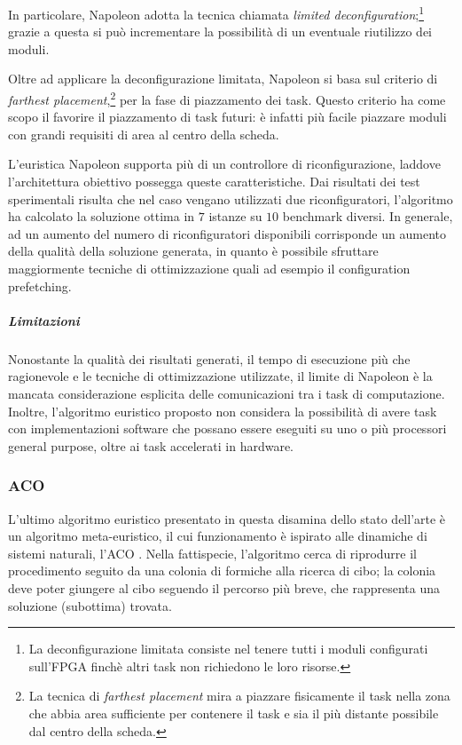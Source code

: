 In particolare, Napoleon adotta la tecnica chiamata \emph{limited 
deconfiguration};\footnote{La deconfigurazione limitata consiste nel tenere 
tutti i moduli configurati sull'\ac{FPGA} finchè altri task non richiedono le 
loro risorse.} grazie a questa si può incrementare la possibilità di 
un eventuale riutilizzo dei moduli.

Oltre ad applicare la deconfigurazione limitata, Napoleon si basa sul criterio 
di \emph{farthest placement},\footnote{La tecnica di \emph{farthest placement} 
mira a piazzare fisicamente il task nella zona che abbia area sufficiente per 
contenere il task e sia il più distante possibile dal centro della scheda.} per 
la fase di piazzamento dei task. Questo criterio ha come scopo il favorire il 
piazzamento di task futuri: è infatti più facile piazzare moduli con grandi 
requisiti di area al centro della scheda.

L'euristica Napoleon supporta più di un controllore di riconfigurazione, 
laddove l'architettura obiettivo possegga queste caratteristiche. Dai risultati 
dei test sperimentali risulta che nel caso vengano utilizzati due 
riconfiguratori, l'algoritmo ha calcolato la soluzione ottima in $7$ istanze su 
$10$ benchmark diversi. In generale, ad un aumento del numero di 
riconfiguratori disponibili corrisponde un aumento della qualità della 
soluzione generata, in quanto è possibile sfruttare maggiormente tecniche di 
ottimizzazione quali ad esempio il configuration prefetching.

\subparagraph{Limitazioni}
Nonostante la qualità dei risultati generati, il tempo di esecuzione più che 
ragionevole e le tecniche di ottimizzazione utilizzate, il limite di Napoleon è 
la mancata considerazione esplicita delle comunicazioni tra i task di 
computazione. Inoltre, l'algoritmo euristico proposto non considera la 
possibilità di avere task con implementazioni software che possano essere 
eseguiti su uno o più processori general purpose, oltre ai task accelerati in 
hardware.


\subsubsection{\acl{ACO}}
L'ultimo algoritmo euristico presentato in questa disamina dello stato 
dell'arte è un algoritmo meta-euristico, il cui funzionamento è ispirato alle 
dinamiche di sistemi naturali, l'\ac{ACO} \cite{AntSystem}. Nella fattispecie, 
l'algoritmo cerca di riprodurre il procedimento seguito da una colonia di 
formiche alla ricerca di cibo; la colonia deve poter giungere al cibo seguendo 
il percorso più breve, che rappresenta una soluzione (subottima) trovata.

